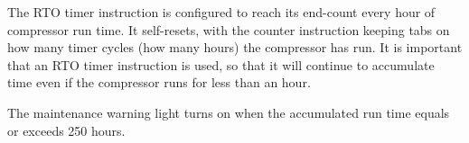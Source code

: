 





The RTO timer instruction is configured to reach its end-count every hour of compressor run time.  It self-resets, with the counter instruction keeping tabs on how many timer cycles (how many hours) the compressor has run.  It is important that an RTO timer instruction is used, so that it will continue to accumulate time even if the compressor runs for less than an hour.

\vskip 10pt

The maintenance warning light turns on when the accumulated run time equals or exceeds 250 hours.




